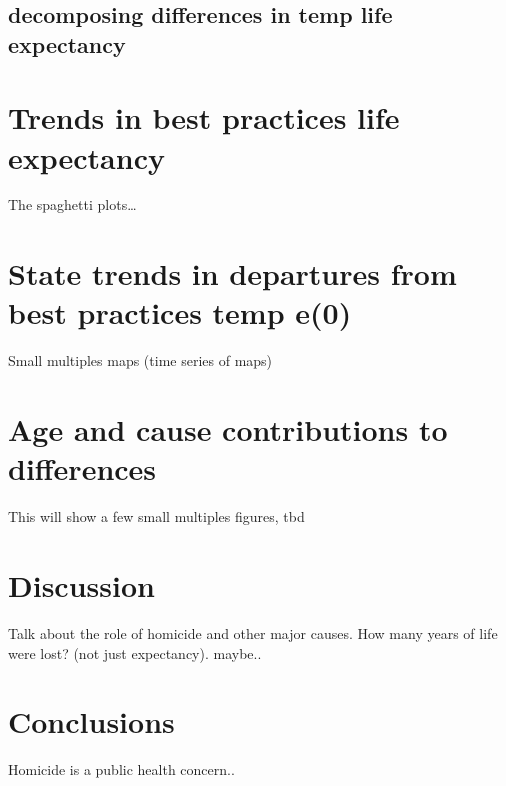 \documentclass{article}
\begin{document}
\subsection{decomposing differences in temp life expectancy}

\section{Trends in best practices life expectancy}
The spaghetti plots\ldots

\section{State trends in departures from best practices temp e(0)}
Small multiples maps (time series of maps)

\section{Age and cause contributions to differences}

This will show a few small multiples figures, tbd 

\section{Discussion}
Talk about the role of homicide and other major causes. How many years of life
were lost? (not just expectancy). maybe..

\section{Conclusions}
Homicide is a public health concern..
\end{document}
